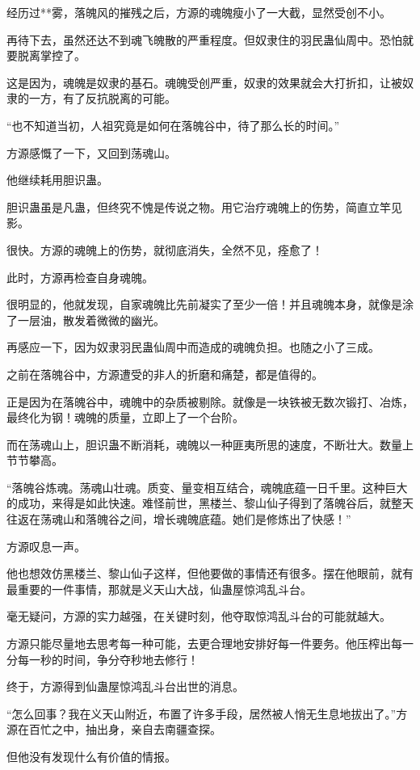 \begin{this_body}
经历过**雾，落魄风的摧残之后，方源的魂魄瘦小了一大截，显然受创不小。

再待下去，虽然还达不到魂飞魄散的严重程度。但奴隶住的羽民蛊仙周中。恐怕就要脱离掌控了。

这是因为，魂魄是奴隶的基石。魂魄受创严重，奴隶的效果就会大打折扣，让被奴隶的一方，有了反抗脱离的可能。

“也不知道当初，人祖究竟是如何在落魄谷中，待了那么长的时间。”

方源感慨了一下，又回到荡魂山。

他继续耗用胆识蛊。

胆识蛊虽是凡蛊，但终究不愧是传说之物。用它治疗魂魄上的伤势，简直立竿见影。

很快。方源的魂魄上的伤势，就彻底消失，全然不见，痊愈了！

此时，方源再检查自身魂魄。

很明显的，他就发现，自家魂魄比先前凝实了至少一倍！并且魂魄本身，就像是涂了一层油，散发着微微的幽光。

再感应一下，因为奴隶羽民蛊仙周中而造成的魂魄负担。也随之小了三成。

之前在落魄谷中，方源遭受的非人的折磨和痛楚，都是值得的。

正是因为在落魄谷中，魂魄中的杂质被剔除。就像是一块铁被无数次锻打、冶炼，最终化为钢！魂魄的质量，立即上了一个台阶。

而在荡魂山上，胆识蛊不断消耗，魂魄以一种匪夷所思的速度，不断壮大。数量上节节攀高。

“落魄谷炼魂。荡魂山壮魂。质变、量变相互结合，魂魄底蕴一日千里。这种巨大的成功，来得是如此快速。难怪前世，黑楼兰、黎山仙子得到了落魄谷后，就整天往返在荡魂山和落魄谷之间，增长魂魄底蕴。她们是修炼出了快感！”

方源叹息一声。

他也想效仿黑楼兰、黎山仙子这样，但他要做的事情还有很多。摆在他眼前，就有最重要的一件事情，那就是义天山大战，仙蛊屋惊鸿乱斗台。

毫无疑问，方源的实力越强，在关键时刻，他夺取惊鸿乱斗台的可能就越大。

方源只能尽量地去思考每一种可能，去更合理地安排好每一件要务。他压榨出每一分每一秒的时间，争分夺秒地去修行！

终于，方源得到仙蛊屋惊鸿乱斗台出世的消息。

“怎么回事？我在义天山附近，布置了许多手段，居然被人悄无生息地拔出了。”方源在百忙之中，抽出身，亲自去南疆查探。

但他没有发现什么有价值的情报。


\end{this_body}
